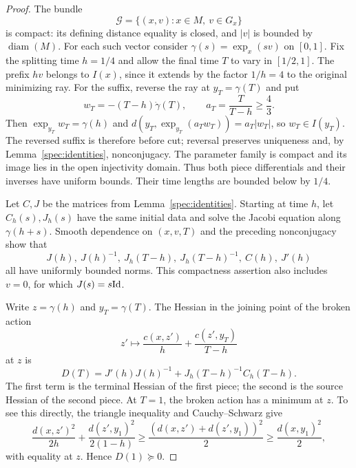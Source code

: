 \begin{proof}
The bundle
\[
  \mathcal G=\{(x,v):x\in M,\ v\in G_x\}
\]
is compact: its defining distance equality is closed, and $|v|$ is
bounded by $\operatorname{diam}(M)$.  For each such vector consider
$\gamma(s)=\exp_x(sv)$ on $[0,1]$.  Fix the splitting time $h=1/4$ and
allow the final time $T$ to vary in $[1/2,1]$.
The prefix $hv$ belongs to $I(x)$, since it extends by the factor
$1/h=4$ to the original minimizing ray. For the suffix, reverse the
ray at $y_T=\gamma(T)$ and put
\[
 w_T=-(T-h)\dot\gamma(T),\qquad
 a_T=\frac{T}{T-h}\ge\frac43.
\]
Then $\exp_{y_T}w_T=\gamma(h)$ and
$d(y_T,\exp_{y_T}(a_Tw_T))=a_T|w_T|$, so $w_T\in I(y_T)$.
The reversed suffix is therefore before cut; reversal preserves
uniqueness and, by Lemma~\ref{spec:identities}, nonconjugacy.
The parameter family is compact and its image lies in the open
injectivity domain. Thus both piece differentials and their inverses
have uniform bounds. Their time lengths are bounded below by $1/4$.

Let $C,J$ be the matrices from Lemma~\ref{spec:identities}.  Starting
at time $h$, let $C_h(s),J_h(s)$ have the same initial data and solve
the Jacobi equation along $\gamma(h+s)$.  Smooth dependence on
$(x,v,T)$ and the preceding nonconjugacy show that
\begin{equation}\label{spec:piece-bounds}
  J(h),\ J(h)^{-1},\ J_h(T-h),\ J_h(T-h)^{-1},\ C(h),\ J'(h)
\end{equation}
all have uniformly bounded norms.  This compactness assertion also
includes $v=0$, for which $J(s)=s\mathrm{Id}$.

Write $z=\gamma(h)$ and $y_T=\gamma(T)$.  The Hessian in the joining
point of the broken action
\[
  z'\longmapsto \frac{c(x,z')}{h}
                     +\frac{c(z',y_T)}{T-h}
\]
at $z$ is
\begin{equation}\label{spec:middle-Hessian}
  D(T)=J'(h)J(h)^{-1}
            +J_h(T-h)^{-1}C_h(T-h).
\end{equation}
The first term is the terminal Hessian of the first piece; the second
is the source Hessian of the second piece.  At $T=1$, the broken
action has a minimum at $z$.  To see this directly, the triangle
inequality and Cauchy--Schwarz give
\[
  \frac{d(x,z')^2}{2h}+\frac{d(z',y_1)^2}{2(1-h)}
    \ge\frac{(d(x,z')+d(z',y_1))^2}{2}
    \ge\frac{d(x,y_1)^2}{2},
\]
with equality at $z$.  Hence $D(1)\succeq0$.


\end{proof}
